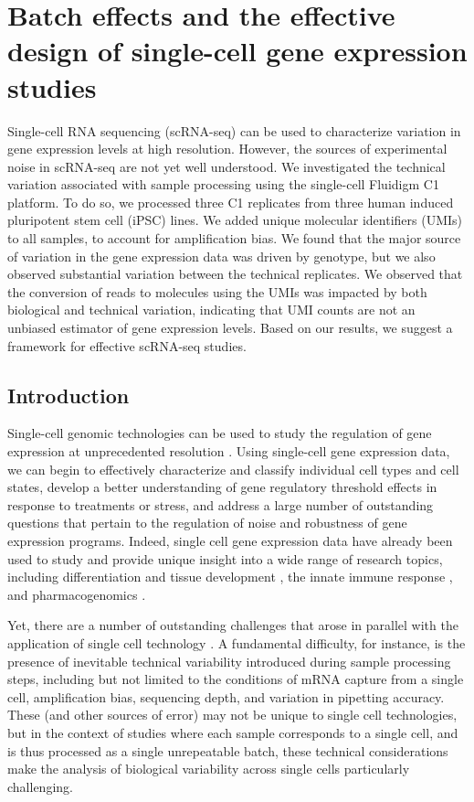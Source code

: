 \chapter{Batch effects and the effective design of single-cell gene expression studies}

Single-cell RNA sequencing (scRNA-seq) can be used to characterize
variation in gene expression levels at high resolution. However, the
sources of experimental noise in scRNA-seq are not yet well understood.
We investigated the technical variation associated with sample
processing using the single-cell Fluidigm C1 platform. To do so, we
processed three C1 replicates from three human induced pluripotent stem
cell (iPSC) lines. We added unique molecular identifiers (UMIs) to all
samples, to account for amplification bias. We found that the major
source of variation in the gene expression data was driven by genotype,
but we also observed substantial variation between the technical
replicates. We observed that the conversion of reads to molecules using
the UMIs was impacted by both biological and technical variation,
indicating that UMI counts are not an unbiased estimator of gene
expression levels. Based on our results, we suggest a framework for
effective scRNA-seq studies.

\section{Introduction}\label{introduction}

Single-cell genomic technologies can be used to study the regulation of
gene expression at unprecedented resolution \citep{Macaulay2014,
Saliba2014}. Using single-cell gene expression data, we can begin to
effectively characterize and classify individual cell types and cell
states, develop a better understanding of gene regulatory threshold
effects in response to treatments or stress, and address a large number
of outstanding questions that pertain to the regulation of noise and
robustness of gene expression programs. Indeed, single cell gene
expression data have already been used to study and provide unique
insight into a wide range of research topics, including differentiation
and tissue development \citep{Macosko2015, Handel2016, Drissen2016},
the innate immune response \citep{Shalek2013, Jaitin2014}, and
pharmacogenomics \citep{Miyamoto2015, Kim2015}.

Yet, there are a number of outstanding challenges that arose in parallel
with the application of single cell technology \citep{Stegle2015}. A
fundamental difficulty, for instance, is the presence of inevitable
technical variability introduced during sample processing steps,
including but not limited to the conditions of mRNA capture from a
single cell, amplification bias, sequencing depth, and variation in
pipetting accuracy. These (and other sources of error) may not be unique
to single cell technologies, but in the context of studies where each
sample corresponds to a single cell, and is thus processed as a single
unrepeatable batch, these technical considerations make the analysis of
biological variability across single cells particularly challenging.

